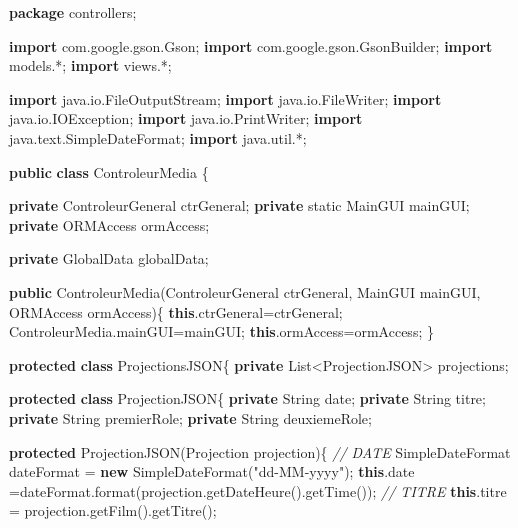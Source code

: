 \documentclass[]{article}
\newenvironment{Shaded}{}{}
\newcommand{\KeywordTok}[1]{\textcolor[rgb]{0.00,0.44,0.13}{\textbf{{#1}}}}
\newcommand{\DataTypeTok}[1]{\textcolor[rgb]{0.56,0.13,0.00}{{#1}}}
\newcommand{\StringTok}[1]{\textcolor[rgb]{0.25,0.44,0.63}{{#1}}}
\newcommand{\ImportTok}[1]{{#1}}
\newcommand{\CommentTok}[1]{\textcolor[rgb]{0.38,0.63,0.69}{\textit{{#1}}}}
\newcommand{\FunctionTok}[1]{\textcolor[rgb]{0.02,0.16,0.49}{{#1}}}
\newcommand{\BuiltInTok}[1]{{#1}}
\newcommand{\NormalTok}[1]{{#1}}
\begin{document}
\begin{Shaded}
\begin{Highlighting}[]
\KeywordTok{package}\ImportTok{ controllers;}

\KeywordTok{import}\ImportTok{ com.google.gson.Gson;}
\KeywordTok{import}\ImportTok{ com.google.gson.GsonBuilder;}
\KeywordTok{import}\ImportTok{ models.*;}
\KeywordTok{import}\ImportTok{ views.*;}

\KeywordTok{import}\ImportTok{ java.io.FileOutputStream;}
\KeywordTok{import}\ImportTok{ java.io.FileWriter;}
\KeywordTok{import}\ImportTok{ java.io.IOException;}
\KeywordTok{import}\ImportTok{ java.io.PrintWriter;}
\KeywordTok{import}\ImportTok{ java.text.SimpleDateFormat;}
\KeywordTok{import}\ImportTok{ java.util.*;}

\KeywordTok{public} \KeywordTok{class} \NormalTok{ControleurMedia \{}

	\KeywordTok{private} \NormalTok{ControleurGeneral ctrGeneral;}
	\KeywordTok{private} \DataTypeTok{static} \NormalTok{MainGUI mainGUI;}
	\KeywordTok{private} \NormalTok{ORMAccess ormAccess;}
	
	\KeywordTok{private} \NormalTok{GlobalData globalData;}

	\KeywordTok{public} \FunctionTok{ControleurMedia}\NormalTok{(ControleurGeneral ctrGeneral, MainGUI mainGUI, ORMAccess ormAccess)\{}
		\KeywordTok{this}\NormalTok{.}\FunctionTok{ctrGeneral}\NormalTok{=ctrGeneral;}
		\NormalTok{ControleurMedia.}\FunctionTok{mainGUI}\NormalTok{=mainGUI;}
		\KeywordTok{this}\NormalTok{.}\FunctionTok{ormAccess}\NormalTok{=ormAccess;}
	\NormalTok{\}}

	\KeywordTok{protected} \KeywordTok{class} \NormalTok{ProjectionsJSON\{}
		\KeywordTok{private} \BuiltInTok{List}\NormalTok{<ProjectionJSON> projections;}

		\KeywordTok{protected} \KeywordTok{class} \NormalTok{ProjectionJSON\{}
			\KeywordTok{private} \BuiltInTok{String} \NormalTok{date;}
			\KeywordTok{private} \BuiltInTok{String} \NormalTok{titre;}
			\KeywordTok{private} \BuiltInTok{String} \NormalTok{premierRole;}
			\KeywordTok{private} \BuiltInTok{String} \NormalTok{deuxiemeRole;}

			\KeywordTok{protected} \FunctionTok{ProjectionJSON}\NormalTok{(Projection projection)\{}
				\CommentTok{// DATE}
				\BuiltInTok{SimpleDateFormat} \NormalTok{dateFormat = }\KeywordTok{new} \BuiltInTok{SimpleDateFormat}\NormalTok{(}\StringTok{"dd-MM-yyyy"}\NormalTok{);}
				\KeywordTok{this}\NormalTok{.}\FunctionTok{date} \NormalTok{=dateFormat}\FunctionTok{.format}\NormalTok{(projection.}\FunctionTok{getDateHeure}\NormalTok{().}\FunctionTok{getTime}\NormalTok{());}
				\CommentTok{// TITRE}
				\KeywordTok{this}\NormalTok{.}\FunctionTok{titre} \NormalTok{= projection.}\FunctionTok{getFilm}\NormalTok{().}\FunctionTok{getTitre}\NormalTok{();}


\end{Highlighting}
\end{Shaded}
\end{document}
